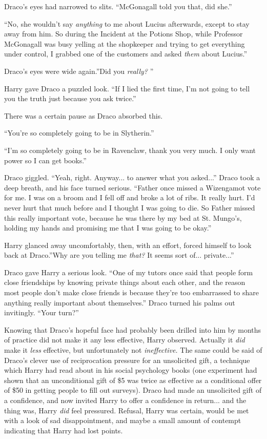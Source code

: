 Draco's eyes had narrowed to slits. ``McGonagall told you that, did
she.''

``No, she wouldn't say \emph{anything} to me about Lucius afterwards,
except to stay away from him. So during the Incident at the Potions
Shop, while Professor McGonagall was busy yelling at the shopkeeper and
trying to get everything under control, I grabbed one of the customers
and asked \emph{them} about Lucius.''

Draco's eyes were wide again.''Did you \emph{really?} ''

Harry gave Draco a puzzled look. ``If I lied the first time, I'm not
going to tell you the truth just because you ask twice.''

There was a certain pause as Draco absorbed this.

``You're so completely going to be in Slytherin.''

``I'm so completely going to be in Ravenclaw, thank you very much. I
only want power so I can get books.''

Draco giggled. ``Yeah, right. Anyway... to answer what you
asked...'' Draco took a deep breath, and his face turned serious.
``Father once missed a Wizengamot vote for me. I was on a broom and I
fell off and broke a lot of ribs. It really hurt. I'd never hurt that
much before and I thought I was going to die. So Father missed this
really important vote, because he was there by my bed at St. Mungo's,
holding my hands and promising me that I was going to be okay.''

Harry glanced away uncomfortably, then, with an effort, forced himself
to look back at Draco.''Why are you telling me \emph{that?} It seems
sort of... private...''

Draco gave Harry a serious look. ``One of my tutors once said that
people form close friendships by knowing private things about each
other, and the reason most people don't make close friends is because
they're too embarrassed to share anything really important about
themselves.'' Draco turned his palms out invitingly. ``Your turn?''

Knowing that Draco's hopeful face had probably been drilled into him by
months of practice did not make it any less effective, Harry observed.
Actually it \emph{did} make it \emph{less} effective, but unfortunately
not \emph{ineffective.} The same could be said of Draco's clever use of
reciprocation pressure for an unsolicited gift, a technique which Harry
had read about in his social psychology books (one experiment had shown
that an unconditional gift of \$5 was twice as effective as a
conditional offer of \$50 in getting people to fill out surveys). Draco
had made an unsolicited gift of a confidence, and now invited Harry to
offer a confidence in return... and the thing was, Harry \emph{did}
feel pressured. Refusal, Harry was certain, would be met with a look of
sad disappointment, and maybe a small amount of contempt indicating that
Harry had lost points.

